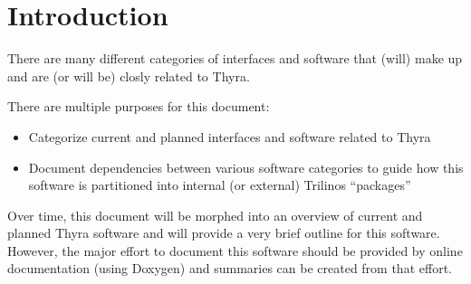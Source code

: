 \documentclass[pdf,ps2pdf,11pt]{SANDreport}
\begin{document}


%
\setcounter{secnumdepth}{3}
\SANDmain %

\section{Introduction}

There are many different categories of interfaces and software that (will)
make up and are (or will be) closly related to Thyra.

There are multiple purposes for this document:
\begin{itemize}
%
{}\item Categorize current and planned interfaces and software related to Thyra
%
{}\item Document dependencies between various software categories to guide how
this software is partitioned into internal (or external) Trilinos
``packages''
%
\end{itemize}

Over time, this document will be morphed into an overview of current and
planned Thyra software and will provide a very brief outline for this
software.  However, the major effort to document this software should be
provided by online documentation (using Doxygen) and summaries can be created
from that effort.
\end{document}
